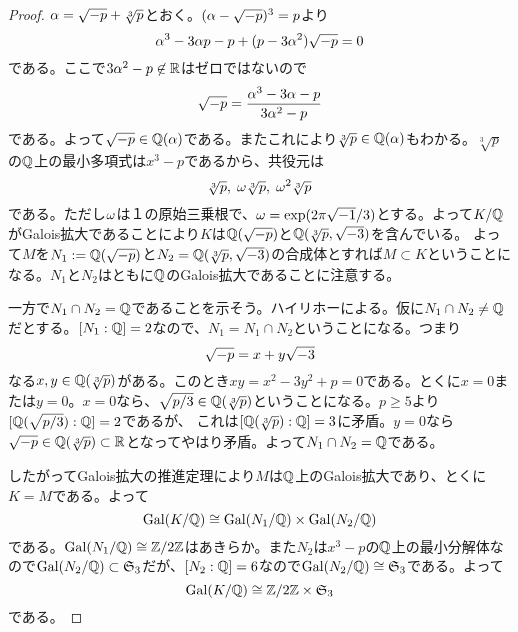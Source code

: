 \subsubsection{}%
\begin{proof}
  ${\alpha} = \sqrt{-p } + \sqrt[3]{p}$とおく。$({\alpha} - \sqrt{ -p})^3 = p$より
  \[
  {\alpha}^3 - 3 {\alpha} p - p + (p - 3{\alpha}^2) \sqrt{-p} = 0
  \]
  である。ここで$3 {\alpha}^2 - p \not\in {\mathbb R}$はゼロではないので
  \[
  \sqrt{-p} = \frac{{\alpha}^3 - 3{\alpha} - p}{3{\alpha}^2 -p}
  \]
  である。よって$\sqrt{-p} \in {\mathbb Q}({\alpha})$である。またこれにより$\sqrt[3]{p} \in {\mathbb Q}({\alpha})$もわかる。$\sqrt[3]{p}$の${\mathbb Q}$上の最小多項式は$x^3-p$であるから、共役元は
  \[
  \sqrt[3]{p}, \; {\omega} \sqrt[3]{p} , \; {\omega}^2 \sqrt[3]{p}
  \]
  である。ただし${\omega}$は１の原始三乗根で、${\omega} = \exp(2 \pi \sqrt{-1}/3)$とする。よって$K/{\mathbb Q}$がGalois拡大であることにより$K$は${\mathbb Q}(\sqrt{-p})$と${\mathbb Q}(\sqrt[3]{p}, \sqrt{-3})$を含んでいる。
  よって$M$を$N_1 := {\mathbb Q}(\sqrt{-p})$と$N_2 = {\mathbb Q}(\sqrt[3]{p}, \sqrt{-3})$の合成体とすれば$M \subset K$ということになる。$N_1$と$N_2$はともに${\mathbb Q}$のGalois拡大であることに注意する。

  一方で$N_1 \cap N_2 = {\mathbb Q}$であることを示そう。ハイリホーによる。仮に$N_1 \cap N_2 \neq {\mathbb Q}$だとする。$[N_1 : {\mathbb Q}] = 2$なので、$N_1 = N_1 \cap N_2$ということになる。つまり
  \[
  \sqrt{-p} = x + y \sqrt{-3}
  \]
  なる$x, y \in {\mathbb Q}(\sqrt[3]{p})$がある。このとき$xy = x^2 - 3y^2 + p=0$である。とくに$x=0$または$y=0$。$x=0$なら、$\sqrt{p/3} \in {\mathbb Q}(\sqrt[3]{p})$ということになる。$p \geq 5$より$[{\mathbb Q}(\sqrt{p/3}): {\mathbb Q} ] = 2$であるが、
  これは$[{\mathbb Q}(\sqrt[3]{p}) : {\mathbb Q}] = 3$に矛盾。$y=0$なら$\sqrt{-p} \in {\mathbb Q}(\sqrt[3]{p}) \subset {\mathbb R}$となってやはり矛盾。よって$N_1 \cap N_2 = {\mathbb Q}$である。

  したがってGalois拡大の推進定理により$M$は${\mathbb Q}$上のGalois拡大であり、とくに$K = M$である。よって
  \[
  \operatorname{Gal}(K/{\mathbb Q}) \cong \operatorname{Gal}(N_1 / {\mathbb Q}) \times \operatorname{Gal}(N_2/{\mathbb Q})
  \]
  である。$\operatorname{Gal}(N_1/{\mathbb Q}) \cong \mathbb{Z} / 2 \mathbb{Z}$はあきらか。また$N_2$は$x^3 - p$の${\mathbb Q}$上の最小分解体なので$\operatorname{Gal}(N_2 / {\mathbb Q}) \subset \mathfrak{S}_3$だが、$[N_2: {\mathbb Q}]=6$なので$\operatorname{Gal}(N_2 / {\mathbb Q}) \cong \mathfrak{S}_3$である。よって
  \[
    \operatorname{Gal}(K/{\mathbb Q}) \cong \mathbb{Z} / 2 \mathbb{Z} \times \mathfrak{S}_3
  \]
  である。
\end{proof}

\newpage

